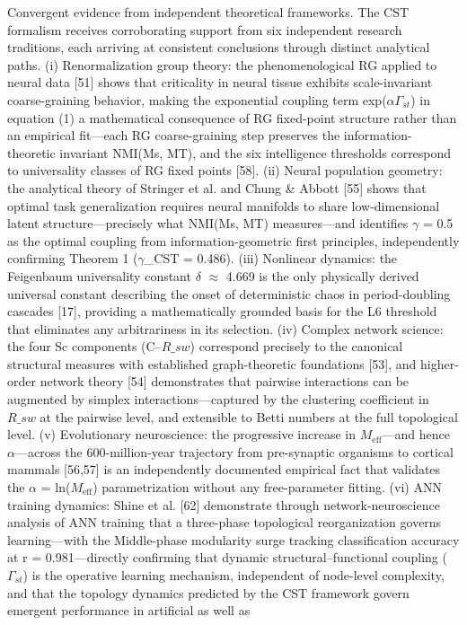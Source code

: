 \documentclass[a4paper,12pt]{article}
\begin{document}
Convergent evidence from independent theoretical frameworks.
The CST formalism receives corroborating support from six independent research traditions, each arriving at consistent conclusions through distinct analytical paths. (i) Renormalization group theory: the phenomenological RG applied to neural data [51] shows that criticality in neural tissue exhibits scale-invariant coarse-graining behavior, making the exponential coupling term
exp($\alpha$\cdot$\Gamma_{st}$) in equation (1) a mathematical consequence of RG fixed-point structure rather than an empirical fit---each RG coarse-graining step preserves the information-theoretic invariant NMI(Ms, MT), and the six intelligence thresholds correspond to universality classes of RG fixed points [58]. (ii) Neural population geometry: the analytical theory of Stringer et al. and
Chung \& Abbott [55] shows that optimal task generalization requires neural manifolds to share low-dimensional latent structure---precisely what NMI(Ms, MT) measures---and identifies $\gamma$ = 0.5 as the optimal coupling from information-geometric first principles, independently confirming Theorem 1 ($\gamma$_CST = 0.486). (iii) Nonlinear dynamics: the Feigenbaum universality constant $\delta$
$\approx$ 4.669 is the only physically derived universal constant describing the onset of deterministic chaos in period-doubling cascades [17], providing a mathematically grounded basis for the L6 threshold that eliminates any arbitrariness in its selection. (iv) Complex network science: the four Sc components (C--$R\_{sw}$) correspond precisely to the canonical structural measures with
established graph-theoretic foundations [53], and higher-order network theory [54] demonstrates that pairwise interactions can be augmented by simplex interactions---captured by the clustering coefficient in $R\_{sw}$ at the pairwise level, and extensible to Betti numbers at the full topological level. (v) Evolutionary neuroscience: the progressive increase in $M_{\text{eff}}$---and hence
$\alpha$---across the 600-million-year trajectory from pre-synaptic organisms to cortical mammals [56,57] is an independently documented empirical fact that validates the $\alpha$ = ln($M_{\text{eff}}$) parametrization without any free-parameter fitting. (vi) ANN training dynamics: Shine et al. [62] demonstrate through network-neuroscience analysis of ANN training that a three-phase topological
reorganization governs learning---with the Middle-phase modularity surge tracking classification accuracy at r = 0.981---directly confirming that dynamic structural--functional coupling ($\Gamma_{st}$) is the operative learning mechanism, independent of node-level complexity, and that the topology dynamics predicted by the CST framework govern emergent performance in artificial as well as
\end{document}
